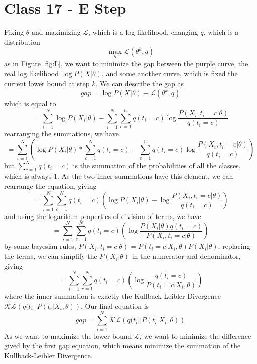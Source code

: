 \documentclass{article}
\begin{document}
\section{Class 17 - E Step}
Fixing $\theta$ and maximizing $\mathcal{L}$, which is a log likelihood, changing $q$, which is a distribution
\begin{equation}
    \max_q \mathcal{L}(\theta^k, q)
\end{equation}
as in Figure \ref{fig:L}, we want to minimize the gap between the purple curve, the real log likelihood $\log P(X|\theta)$, and some another curve, which is fixed the current lower bound at step $k$. We can describe the gap as
\begin{equation}
    gap = \log P(X|\theta) - \mathcal{L}(\theta^k, q)
\end{equation}
which is equal to
\begin{equation}
    = \sum_{i=1}^N \log P(X_i|\theta) - \sum_{i=1}^N \sum_{c=1}^C q(t_i = c) \log \frac{P(X_i, t_i = c|\theta)}{q(t_i = c)}
\end{equation}
rearranging the summations, we have
\begin{equation}
    = \sum_{i=1}^N \left( \log P(X_i|\theta) * \sum_{c=1}^N q(t_i = c) - \sum_{c=1}^C q(t_i = c) \log \frac{P(X_i, t_i = c|\theta)}{q(t_i = c)} \right)
\end{equation}
but $\sum_{c=1}^N q(t_i = c)$ is the summation of the probabilities of all the classes, which is always $1$. As the two inner summations have this element, we can rearrange the equation, giving
\begin{equation}
    = \sum_{i=1}^N \sum_{c=1}^N q(t_i = c) \left( \log P(X_i|\theta) - \log \frac{P(X_i, t_i = c|\theta)}{q(t_i = c)} \right)
\end{equation}
and using the logarithm properties of division of terms, we have
\begin{equation}
    = \sum_{i=1}^N \sum_{c=1}^N q(t_i = c) \left( \log \frac{P(X_i|\theta) q(t_i = c)}{P(X_i, t_i = c|\theta)} \right)
\end{equation}
by some bayesian rules, $P(X_i, t_i = c|\theta) = P(t_i = c|X_i, \theta)P(X_i|\theta)$, replacing the terms, we can simplify the $P(X_i|\theta)$ in the numerator and denominator, giving 
\begin{equation}
    = \sum_{i=1}^N \sum_{c=1}^N q(t_i = c) \left( \log \frac{q(t_i = c)}{P(t_i = c|X_i, \theta)} \right)
\end{equation}
where the inner summation is exactly the Kullback-Leibler Divergence $\mathcal{KL}\left(q(t_i||P(t_i|X_i, \theta)\right)$. Our final equation is
\begin{equation}
    gap = \sum_{i=1}^N \mathcal{KL}\left(q(t_i||P(t_i|X_i, \theta)\right)
\end{equation}
As we want to maximize the lower bound $\mathcal{L}$, we want to minimize the difference gived by the first gap equation, which means minimize the summation of the Kullback-Leibler Divergence.
\end{document}
